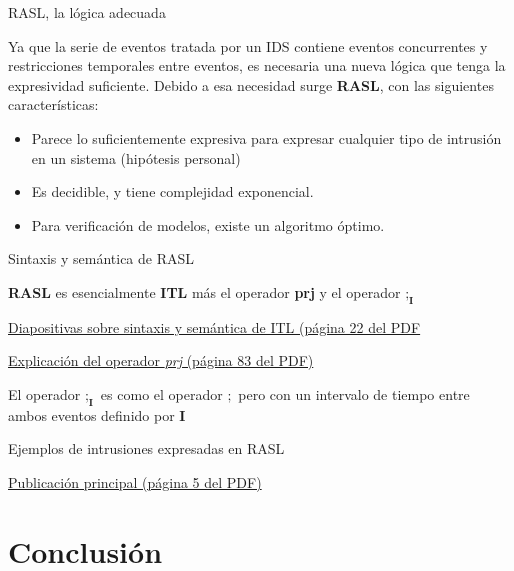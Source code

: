 \documentclass{beamer}
\newcommand{\hrefCustom}[2]{\href{#1}{\color{blue} #2}}
\begin{document}
\begin{frame}{RASL, la lógica adecuada}

Ya que la serie de eventos tratada por un IDS contiene eventos concurrentes y restricciones temporales entre eventos, es necesaria una nueva lógica que tenga la expresividad suficiente. Debido a esa necesidad surge \textbf{RASL}, con las siguientes características:

\begin{itemize}
	\item Parece lo suficientemente expresiva para expresar cualquier tipo de intrusión en un sistema (hipótesis personal)
\end{itemize}
\begin{itemize}
	\item Es decidible, y tiene complejidad exponencial.
\end{itemize}
\begin{itemize}
	\item Para verificación de modelos, existe un algoritmo óptimo.
\end{itemize}

\end{frame}

\begin{frame}{Sintaxis y semántica de RASL}

\textbf{RASL} es esencialmente \textbf{ITL} más el operador \textbf{prj} y el operador \(\mathbf{\bm{;}_I}\)

\hrefCustom{part-all.pdf}{Diapositivas sobre sintaxis y semántica de ITL (página 22 del PDF}

\hrefCustom{Duan, Z. 1996.pdf}{Explicación del operador \emph{prj} (página 83 del PDF)}

El operador \(\mathbf{\bm{;}_I}\) es como el operador \(\bm{;}\) pero con un intervalo de tiempo entre ambos eventos definido por \textbf{I}

\end{frame}

\begin{frame}{Ejemplos de intrusiones expresadas en RASL}

\hrefCustom{621203.pdf}{Publicación principal (página 5 del PDF)}

\end{frame}

\section{Conclusión}
\end{document}
